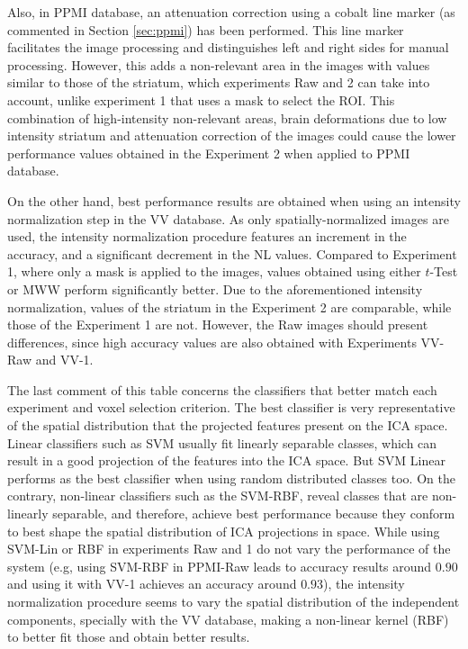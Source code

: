 	Also, in PPMI database, an attenuation correction using a cobalt line marker (as commented in Section \ref{sec:ppmi}) has been performed. This line marker facilitates the image processing and distinguishes left and right sides for manual processing. However, this adds a non-relevant area in the images with values similar to those of the striatum, which experiments Raw and 2 can take into account, unlike experiment 1 that uses a mask to select the ROI. This combination of high-intensity non-relevant areas, brain deformations due to low intensity striatum and attenuation correction of the images could cause the lower performance values obtained in the Experiment 2 when applied to PPMI database. 
	
	On the other hand, best performance results are obtained when using an intensity normalization step in the VV database. As only spatially-normalized images are used, the intensity normalization procedure features an increment in the accuracy, and a significant decrement in the NL values. Compared to Experiment 1, where only a mask is applied to the images, values obtained using either $t$-Test or MWW perform significantly better. Due to the aforementioned intensity normalization, values of the striatum in the Experiment 2 are comparable, while those of the Experiment 1 are not. However, the Raw images should present differences, since high accuracy values are also obtained with Experiments VV-Raw and VV-1. 
	
	The last comment of this table concerns the classifiers that better match each experiment and voxel selection criterion. The best classifier is very representative of the spatial distribution that the projected features present on the ICA space. Linear classifiers such as SVM usually fit linearly separable classes, which can result in a good projection of the features into the ICA space. But SVM Linear performs as the best classifier when using random distributed classes too. On the contrary, non-linear classifiers such as the SVM-RBF, reveal classes that are non-linearly separable, and therefore, achieve best performance because they conform to best shape the spatial distribution of ICA projections in space. While using SVM-Lin or RBF in experiments Raw and 1 do not vary the performance of the system (e.g, using SVM-RBF in PPMI-Raw leads to accuracy results around $0.90$ and using it with VV-1 achieves an accuracy around $0.93$), the intensity normalization procedure seems to vary the spatial distribution of the independent components, specially with the VV database, making a non-linear kernel (RBF) to better fit those and obtain better results. 
	
